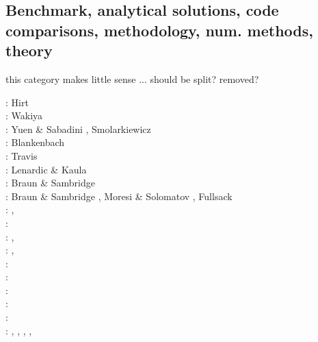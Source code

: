 \subsection{Benchmark, analytical solutions, code comparisons, methodology, num. methods, theory}

{\color{red} this category makes little sense ... should be split? removed? }

\begin{scriptsize}
\nineteenseventyfour: Hirt \etal \cite{hiac74}\\
\nineteenseventyfive: Wakiya \cite{waki75a,waki75b}\\
\nineteeneightyfour: Yuen \& Sabadini \cite{yusa84}, Smolarkiewicz \cite{smol84}\\
\nineteeneightynine: Blankenbach \etal \cite{blbc89}\\
\nineteenninety: Travis \etal \cite{trab90}\\
\nineteenninetythree: Lenardic \& Kaula \cite{leka93}\\
\nineteenninetyfour: Braun \& Sambridge \cite{brsa94}\\
\nineteenninetyfive: Braun \& Sambridge \cite{brsa95}, Moresi \& Solomatov \cite{moso95}, 
                     Fullsack \cite{full95}\\
\nineteenninetysix: \cite{zhon96}, \cite{mozg96}\\
\nineteenninetyseven: \cite{rist97}\\
\nineteenninetynine: \cite{lind99}, \cite{bird99}\\
\twothousandone: \cite{modm01}, \cite{vank01}\\
\twothousandtwo: \cite{mudm02}\\
\twothousandthree: \cite{taki03}\cite{modm03}\cite{geyu03}\cite{geyu03b}\cite{taxi03}\cite{scpo03}\\
\twothousandfour: \cite{kaps04}\cite{kasa04}\cite{kaks08}\cite{mumc04}\\
\twothousandfive: \cite{mure05}\\
\twothousandsix: \cite{kapo06}\cite{more06}\cite{onmm06}\cite{mudm06}\cite{tact06}\\
\twothousandseven: 
\cite{toma07},
\cite{chcc07},
\cite{kabe07},
\cite{kaks07},

\end{scriptsize}
